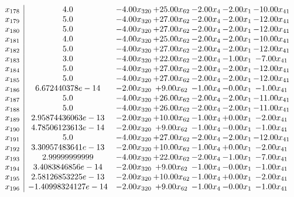 \documentclass[8pt]{article}
\begin{document}
\[\begin{array}{c| c c@{\hskip 2pt} c@{\hskip 2pt} c@{\hskip 2pt} c@{\hskip 2pt} c@{\hskip 2pt} }
 x_{178}   &  4.0 & -4.00 x_{320} & + 25.00 x_{62} & -2.00 x_{4} & -2.00 x_{1} & -10.00 x_{41}\\
 x_{179}   &  5.0 & -4.00 x_{320} & + 27.00 x_{62} & -2.00 x_{4} & -2.00 x_{1} & -12.00 x_{41}\\
 x_{180}   &  5.0 & -4.00 x_{320} & + 27.00 x_{62} & -2.00 x_{4} & -2.00 x_{1} & -12.00 x_{41}\\
 x_{181}   &  4.0 & -4.00 x_{320} & + 25.00 x_{62} & -2.00 x_{4} & -2.00 x_{1} & -10.00 x_{41}\\
 x_{182}   &  5.0 & -4.00 x_{320} & + 27.00 x_{62} & -2.00 x_{4} & -2.00 x_{1} & -12.00 x_{41}\\
 x_{183}   &  3.0 & -4.00 x_{320} & + 22.00 x_{62} & -2.00 x_{4} & -1.00 x_{1} & -7.00 x_{41}\\
 x_{184}   &  5.0 & -4.00 x_{320} & + 27.00 x_{62} & -2.00 x_{4} & -2.00 x_{1} & -12.00 x_{41}\\
 x_{185}   &  5.0 & -4.00 x_{320} & + 27.00 x_{62} & -2.00 x_{4} & -2.00 x_{1} & -12.00 x_{41}\\
 x_{186}   &  6.672440378e-14 & -2.00 x_{320} & +  9.00 x_{62} & -1.00 x_{4} & -0.00 x_{1} & -1.00 x_{41}\\
 x_{187}   &  5.0 & -4.00 x_{320} & + 26.00 x_{62} & -2.00 x_{4} & -2.00 x_{1} & -11.00 x_{41}\\
 x_{188}   &  5.0 & -4.00 x_{320} & + 26.00 x_{62} & -2.00 x_{4} & -2.00 x_{1} & -11.00 x_{41}\\
 x_{189}   &  2.95874436063e-13 & -2.00 x_{320} & + 10.00 x_{62} & -1.00 x_{4} & +  0.00 x_{1} & -2.00 x_{41}\\
 x_{190}   &  4.78506123613e-14 & -2.00 x_{320} & +  9.00 x_{62} & -1.00 x_{4} & -0.00 x_{1} & -1.00 x_{41}\\
 x_{191}   &  5.0 & -4.00 x_{320} & + 27.00 x_{62} & -2.00 x_{4} & -2.00 x_{1} & -12.00 x_{41}\\
 x_{192}   &  3.30957483641e-13 & -2.00 x_{320} & + 10.00 x_{62} & -1.00 x_{4} & +  0.00 x_{1} & -2.00 x_{41}\\
 x_{193}   &  2.99999999999 & -4.00 x_{320} & + 22.00 x_{62} & -2.00 x_{4} & -1.00 x_{1} & -7.00 x_{41}\\
 x_{194}   &  3.4083846856e-14 & -2.00 x_{320} & +  9.00 x_{62} & -1.00 x_{4} & -0.00 x_{1} & -1.00 x_{41}\\
 x_{195}   &  2.58126853225e-13 & -2.00 x_{320} & + 10.00 x_{62} & -1.00 x_{4} & +  0.00 x_{1} & -2.00 x_{41}\\
 x_{196}   &  -1.40998324127e-14 & -2.00 x_{320} & +  9.00 x_{62} & -1.00 x_{4} & -0.00 x_{1} & -1.00 x_{41}\\

\end{array}\]
\end{document}
